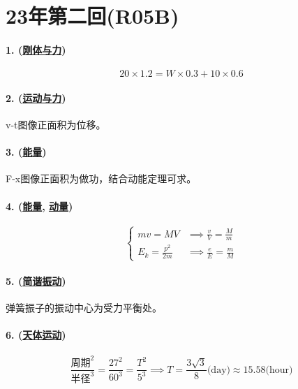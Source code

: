 
\section{23年第二回(R05B)}

\paragraph{1. (\hyperref[subsec:刚体与力]{刚体与力})}

\begin{equation*}
    20\times1.2=W\times0.3+10\times0.6
\end{equation*}

\paragraph{2. (\hyperref[subsec:运动与力]{运动与力})} v-t图像正面积为位移。

\paragraph{3. (\hyperref[subsec:能量]{能量})} F-x图像正面积为做功，结合动能定理可求。

\paragraph{4. (\hyperref[subsec:能量]{能量}, \hyperref[subsec:动量]{动量})}

\begin{equation*}
    \begin{cases}
        mv=MV&\implies\frac{v}{V}=\frac{M}{m}\\
        E_k=\frac{p^2}{2m}&\implies\frac{e}{E}=\frac{m}{M}
    \end{cases}
\end{equation*}

\paragraph{5. (\hyperref[subsec:简谐振动]{简谐振动})} 弹簧振子的振动中心为受力平衡处。

\paragraph{6. (\hyperref[subsec:天体运动]{天体运动})}

\begin{equation*}
    \frac{\text{周期}^2}{\text{半径}^3}=\frac{27^2}{60^3}=\frac{T^2}{5^3}
    \implies T=\frac{3\sqrt3}{8}\text{(day)}\approx 15.58\text{(hour)}
\end{equation*}


